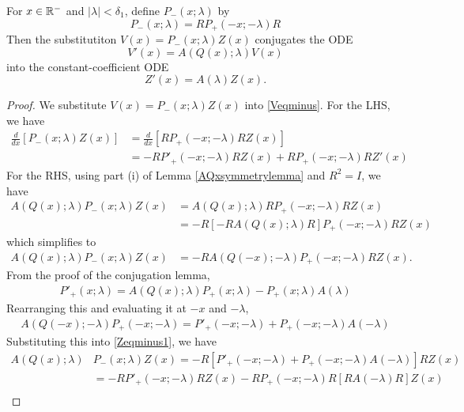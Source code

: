 \documentclass[thesis.tex]{subfiles}
\begin{document}
\begin{lemma}\label{conjRminuslemma}
For $x \in \mathbb{R}^-$ and $|\lambda| < \delta_1$, define $P_-(x; \lambda)$ by
\begin{equation}\label{defPminus}
P_-(x; \lambda) = RP_+(-x; -\lambda)R
\end{equation}
Then the substitutiton $V(x) = P_-(x; \lambda) Z(x)$ conjugates the ODE 
\begin{equation}\label{Veqminus}
V'(x) = A(Q(x); \lambda) V(x)
\end{equation}
into the constant-coefficient ODE 
\begin{equation}\label{Zeqminus}
Z'(x) = A(\lambda)Z(x).
\end{equation}
\begin{proof}
We substitute $V(x) = P_-(x; \lambda) Z(x)$ into \eqref{Veqminus}. For the LHS, we have
\begin{align*}
\frac{d}{dx}[P_-(x; \lambda) Z(x)] &= \frac{d}{dx}[RP_+(-x; -\lambda)R Z(x)] \\
&= -RP'_+(-x; -\lambda)R Z(x) + RP_+(-x; -\lambda)R Z'(x)
\end{align*}
For the RHS, using part (i) of Lemma \ref{AQxsymmetrylemma} and $R^2 = I$, we have
\begin{align*}
A(Q(x); \lambda)P_-(x; \lambda) Z(x) &= A(Q(x); \lambda)RP_+(-x; -\lambda)R Z(x) \\
&= -R[ -R A(Q(x); \lambda)R ]P_+(-x; -\lambda)R Z(x) 
\end{align*}
which simplifies to
\begin{align}\label{Zeqminus1}
A(Q(x); \lambda)P_-(x; \lambda) Z(x) &= -R A(Q(-x); -\lambda) P_+(-x; -\lambda)R Z(x). 
\end{align}
From the proof of the conjugation lemma,
\begin{align*}
P'_+(x; \lambda) = A(Q(x); \lambda)P_+(x; \lambda) - P_+(x; \lambda) A(\lambda)
\end{align*}
Rearranging this and evaluating it at $-x$ and $-\lambda$, 
\begin{align*}
 A(Q(-x); -\lambda)P_+(-x; -\lambda) = P'_+(-x; -\lambda) + P_+(-x; -\lambda) A(-\lambda)
\end{align*}
Substituting this into \eqref{Zeqminus1}, we have
\begin{align*}
A(Q(x); \lambda)&P_-(x; \lambda) Z(x) = -R [ P'_+(-x; -\lambda) + P_+(-x; -\lambda) A(-\lambda) ] R Z(x) \\
&= -R P'_+(-x; -\lambda) R Z(x) - R P_+(-x; -\lambda) R [ R A(-\lambda) R]Z(x) \\

\end{align*}
\end{proof}
\end{lemma}
\end{document}
